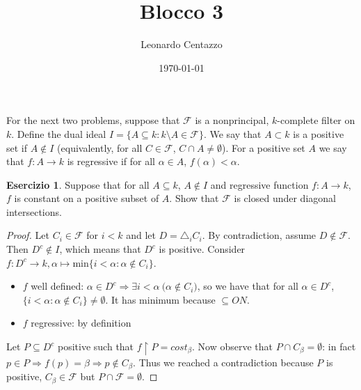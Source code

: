 \documentclass[a4paper,12pt]{article}
\title{Blocco 3}
\author{Leonardo Centazzo}
\date{\today}
\theoremstyle{plain}
\theoremstyle{definition}
\newtheorem{esercizio}{Esercizio}
\theoremstyle{remark}
\begin{document}
\maketitle

For the next two problems, suppose that $\mathcal{F}$ is a nonprincipal, $k$-complete filter on $k$.
Define the dual ideal $I = \{A \subseteq k : k \setminus A \in \mathcal{F}\}$.
We say that $A \subset k$ is a positive set if $A \not \in I$ (equivalently, for all $C \in \mathcal{F}$, $C \cap A \not = \emptyset$).
For a positive set $A$ we say that $f: A \to k$ is regressive if for all $\alpha \in A$, $f(\alpha) < \alpha$.

\begin{esercizio}

	Suppose that for all $A \subseteq k$, $A \not \in I$ and regressive function $f: A \to k$, $f$ is constant on a positive subset of $A$.
	Show that $\mathcal{F}$ is closed under diagonal intersections.

\end{esercizio}

\begin{proof}

	Let $C_i \in \mathcal{F}$ for $i < k$ and let $D = \triangle_i C_i$. 
	By contradiction, assume $D \not \in \mathcal{F}$. Then $D^{c} \not \in I$, which means that $D^{c}$ is positive.
	Consider $f: D^{c} \to k, \alpha \mapsto \text{min}\{i < \alpha : \alpha \not \in C_i \}$.
	\begin{itemize}
		\item $f$ well defined:
			$\alpha \in D^{c} \Rightarrow \exists i < \alpha \ \big( \alpha \not \in C_i \big)$, so we have that 
			for all $\alpha \in D^{c}$, $\{i < \alpha : \alpha \not \in C_i\} \not = \emptyset$.
			It has minimum because $\subseteq ON$.

		\item $f$ regressive: by definition
	\end{itemize}

	Let $P \subseteq D^{c}$ positive such that $f \restriction{P} = cost_{\beta}$.
	Now observe that $P \cap C_{\beta} = \emptyset$: in fact $p \in P \Rightarrow f(p) = \beta \Rightarrow p \not \in C_{\beta}$.
	Thus we reached a contradiction because $P$ is positive, $C_{\beta} \in \mathcal{F}$ but $P \cap \mathcal{F} = \emptyset$.

\end{proof}
\end{document}
